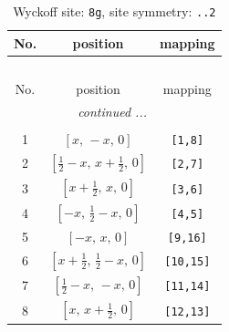 \documentclass[fleqn,8pt]{jsarticle}
\begin{document}
\renewcommand{\arraystretch}{1.2}
\begin{longtable}{ccc}
\caption{Wyckoff site: {\tt 8g}, site symmetry: {\tt ..2}}
 \\
 \hline \hline
No. & position & mapping \\ \hline \endfirsthead

\multicolumn{2}{l}{\tablename\ \thetable{}} \\
 \hline \hline
No. & position & mapping \\ \hline \endhead

 \hline \hline
\multicolumn{2}{r}{\footnotesize\it continued ...} \\ \endfoot

 \hline \hline
\multicolumn{2}{r}{} \\ \endlastfoot

1 & $\left[ x,\, - x,\, 0 \right]$ & {\tt [1,8]} \\ \hline
2 & $\left[ \frac{1}{2} - x,\, x + \frac{1}{2},\, 0 \right]$ & {\tt [2,7]} \\ \hline
3 & $\left[ x + \frac{1}{2},\, x,\, 0 \right]$ & {\tt [3,6]} \\ \hline
4 & $\left[ - x,\, \frac{1}{2} - x,\, 0 \right]$ & {\tt [4,5]} \\ \hline
5 & $\left[ - x,\, x,\, 0 \right]$ & {\tt [9,16]} \\ \hline
6 & $\left[ x + \frac{1}{2},\, \frac{1}{2} - x,\, 0 \right]$ & {\tt [10,15]} \\ \hline
7 & $\left[ \frac{1}{2} - x,\, - x,\, 0 \right]$ & {\tt [11,14]} \\ \hline
8 & $\left[ x,\, x + \frac{1}{2},\, 0 \right]$ & {\tt [12,13]} \\
\end{longtable}
\renewcommand{\arraystretch}{1.2}
\end{document}
